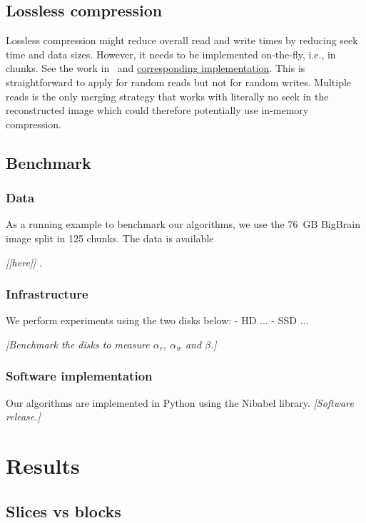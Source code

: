\documentclass[10pt, conference, compsocconf]{IEEEtran}
\newcommand{\todo}[1]{
  \color{red}\emph{[#1]}
  \color{black}
}
\begin{document}
\subsection{Lossless compression}
     
Lossless compression might reduce overall read and write times by
reducing seek time and data sizes. However, it needs to be implemented
on-the-fly, i.e., in chunks. See the work in~\cite{rajna2015speeding}
and
\href{https://github.com/pauldmccarthy/indexed\_gzip}{corresponding
  implementation}. This is straightforward to apply for random reads
but not for random writes. Multiple reads is the only merging strategy
that works with literally no seek in the reconstructed image which
could therefore potentially use in-memory compression.
     
\subsection{Benchmark}
\label{sec:benchmark}

\subsubsection{Data}
As a running example to benchmark our algorithms, we use the 76~GB
BigBrain image split in 125 chunks. The data is available
\todo{[here]}.

\subsubsection{Infrastructure}
 We
perform experiments using the two disks below:
- HD ...
- SSD ...

\todo{Benchmark the disks to measure $\alpha_r$, $\alpha_w$ and $\beta$.}

\subsubsection{Software implementation}

Our algorithms are implemented in Python using the Nibabel
library. \todo{Software release.}

\section{Results}
\label{sec:results}

\subsection{Slices vs blocks}
\end{document}
